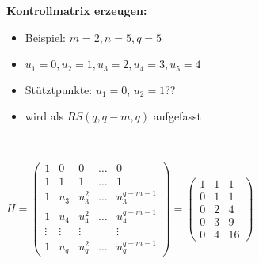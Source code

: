 \textbf{Kontrollmatrix erzeugen:}

\begin{itemize}
\item Beispiel: $m=2, n = 5, q = 5$
\item $u_1 = 0, u_2 = 1, u_3 = 2, u_4 = 3, u_5 = 4$
\item Stütztpunkte: $u_1 = 0$, $u_2 = 1$??
\item wird als $RS(q, q - m, q)$ aufgefasst
\end{itemize}\

$H = \begin{pmatrix}
1 & 0 & 0 & \dots & 0\\
1 & 1 & 1 & \dots & 1\\
1 & u_3 & u_3^2 & \dots & u_3^{q-m-1}\\
1 & u_4 & u_4^2 & \dots & u_4^{q-m-1}\\
\vdots & \vdots & \vdots & & \vdots\\
1 & u_q & u_q^2 & \dots & u_q^{q-m-1}
\end{pmatrix} = \begin{pmatrix}
1 & 1 & 1\\
0 & 1 & 1\\
0 & 2 & 4\\
0 & 3 & 9\\
0 & 4 & 16
\end{pmatrix}$